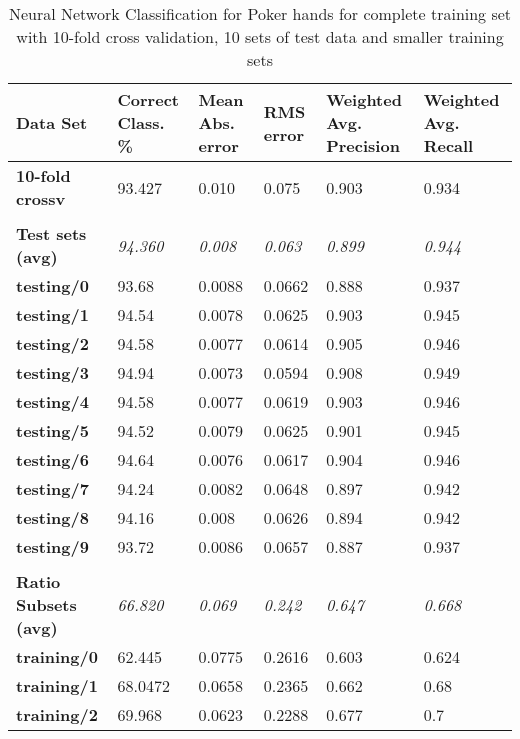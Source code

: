 \documentclass[10pt, a4paper]{article}
\begin{document}
\begin{table}[htbp]
  \centering
  \begin{tabular}{p{3cm}p{1.5cm}p{1.5cm}p{1.5cm}p{1.5cm}p{1.5cm}}
    \toprule
    \textbf{Data Set} & Correct Class. \% & Mean Abs. error & RMS error & Weighted Avg. Precision & Weighted Avg. Recall \\
    \midrule
    \textbf{10-fold crossv} & 93.427 & 0.010 & 0.075 & 0.903 & 0.934 \\
    \textbf{} &       &       &       &       &  \\
    \textbf{Test sets (avg)} & \textit{94.360} & \textit{0.008} & \textit{0.063} & \textit{0.899} & \textit{0.944} \\
    \textbf{   testing/0} & 93.68 & 0.0088 & 0.0662 & 0.888 & 0.937 \\
    \textbf{   testing/1} & 94.54 & 0.0078 & 0.0625 & 0.903 & 0.945 \\
    \textbf{   testing/2} & 94.58 & 0.0077 & 0.0614 & 0.905 & 0.946 \\
    \textbf{   testing/3} & 94.94 & 0.0073 & 0.0594 & 0.908 & 0.949 \\
    \textbf{   testing/4} & 94.58 & 0.0077 & 0.0619 & 0.903 & 0.946 \\
    \textbf{   testing/5} & 94.52 & 0.0079 & 0.0625 & 0.901 & 0.945 \\
    \textbf{   testing/6} & 94.64 & 0.0076 & 0.0617 & 0.904 & 0.946 \\
    \textbf{   testing/7} & 94.24 & 0.0082 & 0.0648 & 0.897 & 0.942 \\
    \textbf{   testing/8} & 94.16 & 0.008 & 0.0626 & 0.894 & 0.942 \\
    \textbf{   testing/9} & 93.72 & 0.0086 & 0.0657 & 0.887 & 0.937 \\
    \textbf{} &       &       &       &       &  \\
    \textbf{Ratio Subsets (avg)} & \textit{66.820} & \textit{0.069} & \textit{0.242} & \textit{0.647} & \textit{0.668} \\
    \textbf{   training/0} & 62.445 & 0.0775 & 0.2616 & 0.603 & 0.624 \\
    \textbf{   training/1} & 68.0472 & 0.0658 & 0.2365 & 0.662 & 0.68 \\
    \textbf{   training/2} & 69.968 & 0.0623 & 0.2288 & 0.677 & 0.7 \\
    \bottomrule
    \end{tabular}%

\caption{Neural Network Classification for Poker hands for complete training set with 10-fold cross validation, 10 sets of test data and smaller training sets}   
  \label{tab:nnresults}%
\end{table}%
\end{document}
